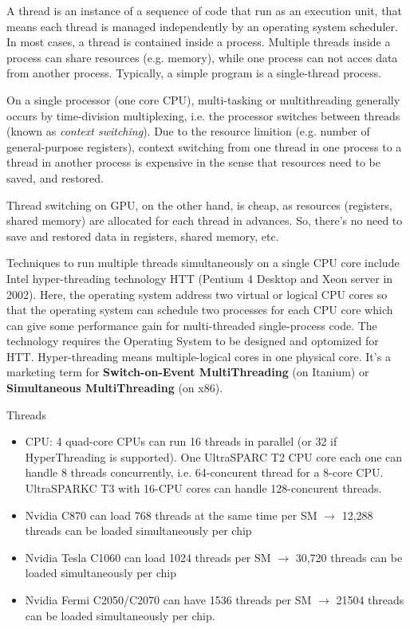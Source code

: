 A thread is an instance of a sequence of code that run as an execution unit,
that means each thread is managed independently by an operating system
scheduler. In most cases, a thread is contained inside a process. Multiple
threads inside a process can share resources (e.g. memory), while one process
can not acces data from another process. Typically, a simple program is a
single-thread process.

On a single processor (one core CPU), multi-tasking or multithreading generally
occurs by time-division multiplexing, i.e. the processor switches between
threads (known as {\it context switching}). Due to the resource limition (e.g.
number of general-purpose registers), context switching from one thread
in one process to a thread in another process is expensive in the sense that
resources need to be saved, and restored.

Thread switching on GPU, on the other hand, is cheap, as resources (registers,
shared memory) are allocated for each thread in advances. So, there's no need to
save and restored data in registers, shared memory, etc.  

Techniques to run multiple threads simultaneously on a single CPU core
include Intel hyper-threading technology HTT (Pentium 4 Desktop and Xeon server in
2002). Here, the operating system address two virtual or logical CPU cores so
that the operating system can schedule two processes for each CPU core which
can give some performance gain for multi-threaded single-process code.
The technology requires the Operating System to be designed and optomized for
HTT. Hyper-threading means multiple-logical cores in one physical core. It's a
marketing term for {\bf Switch-on-Event MultiThreading} (on Itanium) or {\bf
Simultaneous MultiThreading} (on x86). 

Threads
\begin{itemize}  
  \item CPU: 4 quad-core CPUs can run 16 threads in parallel (or 32 if
    HyperThreading is supported). One UltraSPARC T2 CPU core each one can handle
    8 threads concurrently, i.e. 64-concurent thread for a 8-core CPU.
    UltraSPARKC T3 with 16-CPU cores can handle 128-concurent threads. 
    
  \item Nvidia C870 can load 768 threads at the same time per SM
    $\rightarrow$ 12,288 threads can be loaded simultaneously per chip
  \item Nvidia Tesla C1060 can load 1024 threads per SM $\rightarrow$ 30,720
    threads can be loaded simultaneously per chip
  \item Nvidia Fermi C2050/C2070 can have 1536 threads per SM $\rightarrow$
  21504 threads can be loaded simultaneously per chip. 
\end{itemize}

